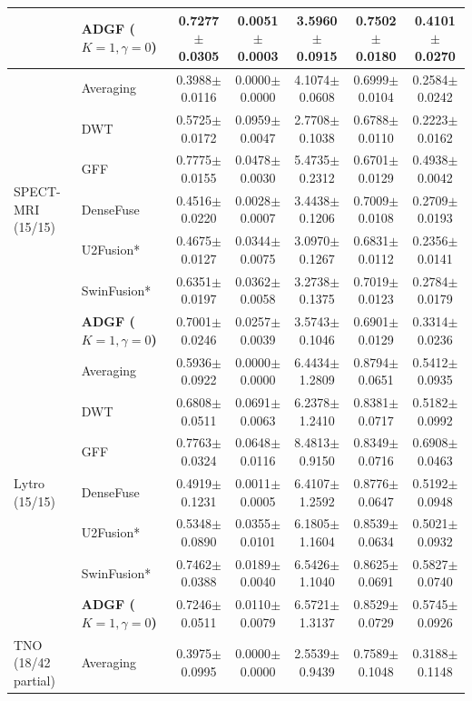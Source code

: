 \documentclass[conference]{IEEEtran}
\begin{document}
\begin{table}[htbp]
\begin{tabular}{llccccc}
& \textbf{ADGF ($K=1,\gamma=0$)} & 0.7277$\pm$0.0305 & 0.0051$\pm$0.0003 & 3.5960$\pm$0.0915 & 0.7502$\pm$0.0180 & 0.4101$\pm$0.0270 \\
\midrule
\multirow{7}{*}{SPECT-MRI (15/15)}
& Averaging & 0.3988$\pm$0.0116 & 0.0000$\pm$0.0000 & 4.1074$\pm$0.0608 & 0.6999$\pm$0.0104 & 0.2584$\pm$0.0242 \\
& DWT & 0.5725$\pm$0.0172 & 0.0959$\pm$0.0047 & 2.7708$\pm$0.1038 & 0.6788$\pm$0.0110 & 0.2223$\pm$0.0162 \\
& GFF & 0.7775$\pm$0.0155 & 0.0478$\pm$0.0030 & 5.4735$\pm$0.2312 & 0.6701$\pm$0.0129 & 0.4938$\pm$0.0042 \\
& DenseFuse & 0.4516$\pm$0.0220 & 0.0028$\pm$0.0007 & 3.4438$\pm$0.1206 & 0.7009$\pm$0.0108 & 0.2709$\pm$0.0193 \\
& U2Fusion* & 0.4675$\pm$0.0127 & 0.0344$\pm$0.0075 & 3.0970$\pm$0.1267 & 0.6831$\pm$0.0112 & 0.2356$\pm$0.0141 \\
& SwinFusion* & 0.6351$\pm$0.0197 & 0.0362$\pm$0.0058 & 3.2738$\pm$0.1375 & 0.7019$\pm$0.0123 & 0.2784$\pm$0.0179 \\
& \textbf{ADGF ($K=1,\gamma=0$)} & 0.7001$\pm$0.0246 & 0.0257$\pm$0.0039 & 3.5743$\pm$0.1046 & 0.6901$\pm$0.0129 & 0.3314$\pm$0.0236 \\
\midrule
\multirow{7}{*}{Lytro (15/15)}
& Averaging & 0.5936$\pm$0.0922 & 0.0000$\pm$0.0000 & 6.4434$\pm$1.2809 & 0.8794$\pm$0.0651 & 0.5412$\pm$0.0935 \\
& DWT & 0.6808$\pm$0.0511 & 0.0691$\pm$0.0063 & 6.2378$\pm$1.2410 & 0.8381$\pm$0.0717 & 0.5182$\pm$0.0992 \\
& GFF & 0.7763$\pm$0.0324 & 0.0648$\pm$0.0116 & 8.4813$\pm$0.9150 & 0.8349$\pm$0.0716 & 0.6908$\pm$0.0463 \\
& DenseFuse & 0.4919$\pm$0.1231 & 0.0011$\pm$0.0005 & 6.4107$\pm$1.2592 & 0.8776$\pm$0.0647 & 0.5192$\pm$0.0948 \\
& U2Fusion* & 0.5348$\pm$0.0890 & 0.0355$\pm$0.0101 & 6.1805$\pm$1.1604 & 0.8539$\pm$0.0634 & 0.5021$\pm$0.0932 \\
& SwinFusion* & 0.7462$\pm$0.0388 & 0.0189$\pm$0.0040 & 6.5426$\pm$1.1040 & 0.8625$\pm$0.0691 & 0.5827$\pm$0.0740 \\
& \textbf{ADGF ($K=1,\gamma=0$)} & 0.7246$\pm$0.0511 & 0.0110$\pm$0.0079 & 6.5721$\pm$1.3137 & 0.8529$\pm$0.0729 & 0.5745$\pm$0.0926 \\
\midrule
\multirow{7}{*}{TNO (18/42 partial)}
& Averaging & 0.3975$\pm$0.0995 & 0.0000$\pm$0.0000 & 2.5539$\pm$0.9439 & 0.7589$\pm$0.1048 & 0.3188$\pm$0.1148 \\

\end{tabular}
\end{table}
\end{document}
